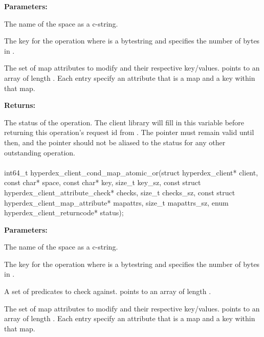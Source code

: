 \noindent\textbf{Parameters:}
\begin{description}[labelindent=\widthof{{\code{mapattrs}, \code{mapattrs\_sz}}},leftmargin=*,noitemsep,nolistsep,align=right]
\item[\code{space}] The name of the space as a c-string.
\item[\code{key}, \code{key\_sz}] The key for the operation where  is a bytestring and  specifies the number of bytes in .
\item[\code{mapattrs}, \code{mapattrs\_sz}] The set of map attributes to modify and their respective key/values.   points to an array of length .  Each entry specify an attribute that is a map and a key within that map.
\end{description}

\noindent\textbf{Returns:}
\begin{description}[labelindent=\widthof{{\code{status}}},leftmargin=*,noitemsep,nolistsep,align=right]
\item[\code{status}] The status of the operation.  The client library will fill in this variable before returning this operation's request id from .  The pointer must remain valid until then, and the pointer should not be aliased to the status for any other outstanding operation.
\end{description}

\paragraph{}
\label{api:c:cond_map_atomic_or}
\begin{ccode}
int64_t hyperdex_client_cond_map_atomic_or(struct hyperdex_client* client,
        const char* space,
        const char* key, size_t key_sz,
        const struct hyperdex_client_attribute_check* checks, size_t checks_sz,
        const struct hyperdex_client_map_attribute* mapattrs, size_t mapattrs_sz,
        enum hyperdex_client_returncode* status);
\end{ccode}
\funcdesc 

\noindent\textbf{Parameters:}
\begin{description}[labelindent=\widthof{{\code{mapattrs}, \code{mapattrs\_sz}}},leftmargin=*,noitemsep,nolistsep,align=right]
\item[\code{space}] The name of the space as a c-string.
\item[\code{key}, \code{key\_sz}] The key for the operation where  is a bytestring and  specifies the number of bytes in .
\item[\code{checks}, \code{checks\_sz}] A set of predicates to check against.   points to an array of length .
\item[\code{mapattrs}, \code{mapattrs\_sz}] The set of map attributes to modify and their respective key/values.   points to an array of length .  Each entry specify an attribute that is a map and a key within that map.
\end{description}

